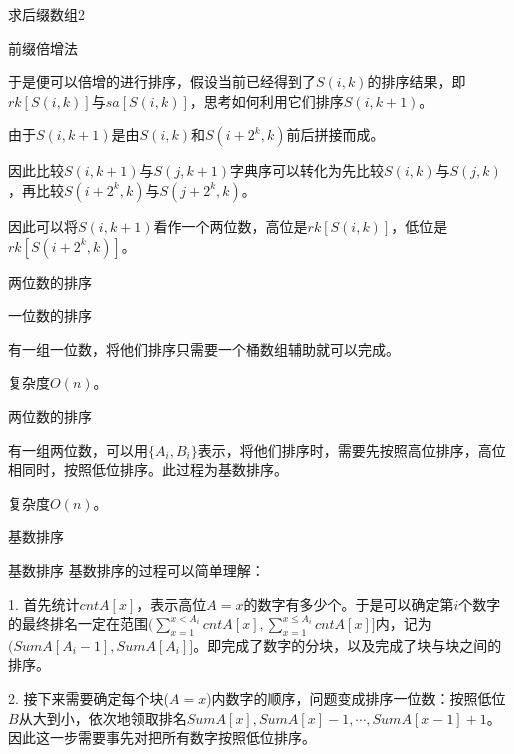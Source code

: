 \documentclass[usenames,dvipsnames]{ctexbeamer}		%
\begin{document}
\begin{frame}{求后缀数组2}

\begin{block}{前缀倍增法}

于是便可以倍增的进行排序，假设当前已经得到了$S(i,k)$的排序结果，即$rk[S(i,k)]$与$sa[S(i,k)]$，思考如何利用它们排序$S(i,k+1)$。

\pause

\vbox{}
由于$S(i, k+1)$是由$S(i,k)$和$S(i + 2^k, k)$前后拼接而成。

因此比较$S(i,k+1)$与$S(j,k+1)$字典序可以转化为先比较$S(i,k)$与$S(j,k)$，再比较$S(i+2^k,k)$与$S(j+2^k,k)$。

\vbox{}
因此可以将$S(i,k+1)$看作一个两位数，高位是$rk[S(i,k)]$，低位是$rk[S(i+2^k,k)]$。
\end{block}

\end{frame}

\begin{frame}{两位数的排序}

\begin{block}{一位数的排序}

有一组一位数，将他们排序只需要一个桶数组辅助就可以完成。

复杂度$O(n)$。

\end{block}

\pause

\begin{block}{两位数的排序}

有一组两位数，可以用$\{A_i,B_i\}$表示，将他们排序时，需要先按照高位排序，高位相同时，按照低位排序。此过程为基数排序。

复杂度$O(n)$。
\end{block}
\end{frame}

\begin{frame}{基数排序}

\begin{block}{基数排序}
基数排序的过程可以简单理解：

1. 首先统计$cntA[x]$，表示高位$A = x$的数字有多少个。于是可以确定第$i$个数字的最终排名一定在范围$\textbf{(}\sum_{x=1}^{x<A_i}cntA[x], \sum_{x=1}^{x \leq A_i}cntA[x]\textbf{]}$内，记为$(SumA[A_i-1], SumA[A_i]]$。即完成了数字的分块，以及完成了块与块之间的排序。

\vbox{}
2. 接下来需要确定每个块($A=x$)内数字的顺序，问题变成排序一位数：按照低位$B$从大到小，依次地领取排名$SumA[x], SumA[x]-1, \cdots,SumA[x-1] + 1$。因此这一步需要事先对把所有数字按照低位排序。
\end{block}
    
\end{frame}
\end{document}
